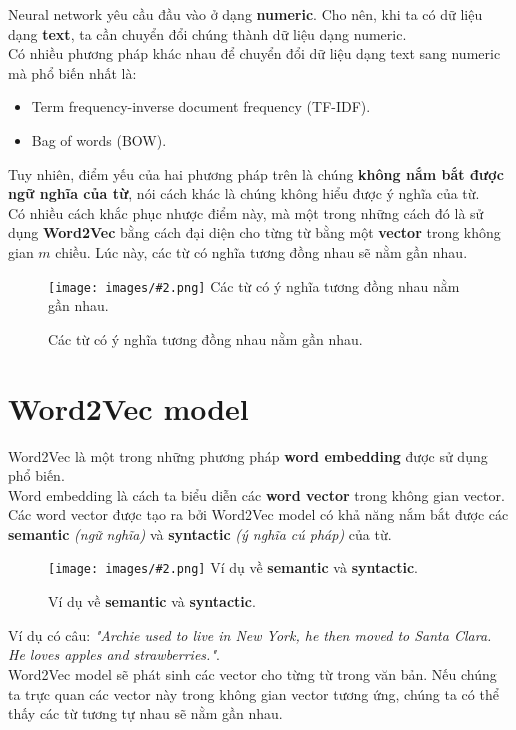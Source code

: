 \documentclass[12pt]{article}
\newcommand{\includeImage}[3]{
\begin{figure}[H]
  \centering
  \texttt{[image: images/\#2.png]}
  \def\temp{#3}\ifx\temp\empty\else\caption{#3}\fi
\end{figure}}
\begin{document}
\tableofcontents
\newpage

Neural network yêu cầu đầu vào ở dạng \textbf{numeric}. Cho nên, khi ta có dữ liệu dạng \textbf{text}, ta cần chuyển đổi chúng thành dữ liệu dạng numeric.\\

\indent Có nhiều phương pháp khác nhau để chuyển đổi dữ liệu dạng text sang numeric mà phổ biến nhất là:
\begin{itemize}
  \setlength{\itemindent}{0.6cm}
  \item Term frequency-inverse document frequency (TF-IDF).
  \item Bag of words (BOW).
\end{itemize}

\vskip 0.5cm
\indent Tuy nhiên, điểm yếu của hai phương pháp trên là chúng \textbf{không nắm bắt được ngữ nghĩa của từ}, nói cách khác là chúng không hiểu được ý nghĩa của từ.\\

\indent Có nhiều cách khắc phục nhược điểm này, mà một trong những cách đó là sử dụng \textbf{Word2Vec} bằng cách đại diện cho từng từ bằng một \textbf{vector} trong không gian $m$ chiều. Lúc này, các từ có nghĩa tương đồng nhau sẽ nằm gần nhau.

\includeImage{0.4}{01}{Các từ có ý nghĩa tương đồng nhau nằm gần nhau.}

\section{Word2Vec model}
Word2Vec là một trong những phương pháp \textbf{word embedding} được sử dụng phổ biến.\\

\indent Word embedding là cách ta biểu diễn các \textbf{word vector} trong không gian vector.\\

\indent Các word vector được tạo ra bởi Word2Vec model có khả năng nắm bắt được các \textbf{semantic} \textit{(ngữ nghĩa)} và \textbf{syntactic} \textit{(ý nghĩa cú pháp)} của từ.\\

\includeImage{1}{03}{Ví dụ về \textbf{semantic} và \textbf{syntactic}.}

\indent Ví dụ có câu: \textsl{"Archie used to live in New York, he then moved to Santa Clara. He loves apples and strawberries."}.\\

\indent Word2Vec model sẽ phát sinh các vector cho từng từ trong văn bản. Nếu chúng ta trực quan các vector này trong không gian vector tương ứng, chúng ta có thể thấy các từ tương tự nhau sẽ nằm gần nhau.
\end{document}
